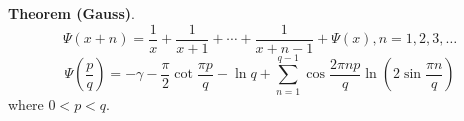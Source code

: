 \documentclass[12pt]{article}
\begin{document}
\textbf{Theorem (Gauss)}.
\[\Psi(x+n)=\frac{1}{x}+\frac{1}{x+1}+\cdots+\frac{1}{x+n-1}+\Psi(x), n=1,2,3,\ldots\]
\[\Psi\left(\frac{p}{q}\right)=-\gamma-\frac{\pi}{2}\cot{\frac{\pi p}{q}}-\ln{q}+\sum_{n=1}^{q-1} \cos\frac{2\pi n p}{q}\ln\left(2\sin\frac{\pi n}{q}\right)\]
where $0<p<q$.

\end{document}
